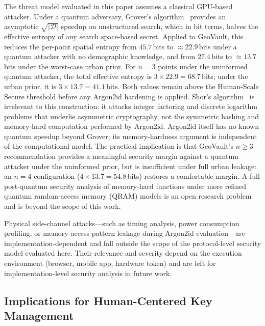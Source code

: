 \documentclass[mathematics,article,accept,pdftex,moreauthors]{Definitions/mdpi}
\begin{document}
{The threat model evaluated in this paper assumes a classical GPU-based attacker. Under a quantum adversary, Grover's algorithm~\cite{Grover1996} provides an asymptotic $\sqrt{|\mathcal{D}|}$ speedup on unstructured search, which in bit terms, halves the effective entropy of any search space-based secret. Applied to GeoVault, this reduces the per-point spatial entropy from $45.7$\,bits to $\approx$$22.9$\,bits under a quantum attacker with no demographic knowledge, and from $27.4$\,bits to $\approx$$13.7$\,bits under the worst-case urban prior. For $n=3$ points under the uninformed quantum attacker, the total effective entropy is $3 \times 22.9 = 68.7$\,bits; under the urban prior, it is $3 \times 13.7 = 41.1$\,bits. Both values remain above the Human-Scale Secure threshold before any Argon2id hardening is applied. Shor's algorithm~\cite{Shor1994} is irrelevant to this construction: it attacks integer factoring and discrete logarithm problems that underlie asymmetric cryptography, not the symmetric hashing and memory-hard computation performed by Argon2id. Argon2id itself has no known quantum speedup beyond Grover; its memory-hardness argument is independent of the computational model. The practical implication is that GeoVault's $n \geq 3$ recommendation provides a meaningful security margin against a quantum attacker under the uninformed prior, but is insufficient under full urban leakage: an $n=4$ configuration ($4 \times 13.7 = 54.8$\,bits) restores a comfortable margin. A full post-quantum security analysis of memory-hard functions under more refined quantum random-access memory (QRAM) models is an open research problem and is beyond the scope of this work.}

{Physical side-channel attacks---such as timing analysis, power consumption profiling, or memory-access pattern leakage during Argon2id evaluation---are implementation-dependent and fall outside the scope of the protocol-level security model evaluated here. Their relevance and severity depend on the execution environment (browser, mobile app, hardware token) and are left for implementation-level security analysis in future work.}

\subsection{Implications for Human-Centered Key Management}

\end{document}
